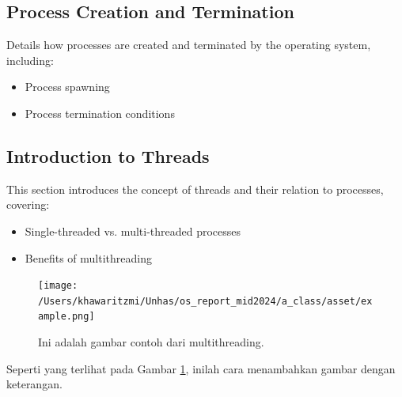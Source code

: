 \documentclass[12pt]{article}
\begin{document}
\subsection{Process Creation and Termination}
Details how processes are created and terminated by the operating system, including:
\begin{itemize}
    \item Process spawning
    \item Process termination conditions
\end{itemize}

\subsection{Introduction to Threads}
This section introduces the concept of threads and their relation to processes, covering:
\begin{itemize}
    \item Single-threaded vs. multi-threaded processes
    \item Benefits of multithreading
\end{itemize}

\begin{figure}[h]
    \centering
    \texttt{[image: /Users/khawaritzmi/Unhas/os\_report\_mid2024/a\_class/asset/example.png]}  %
    \caption{Ini adalah gambar contoh dari multithreading.}
    \label{fig:contoh_gambar}
\end{figure}

Seperti yang terlihat pada Gambar \ref{fig:contoh_gambar}, inilah cara menambahkan gambar dengan keterangan.
\end{document}
